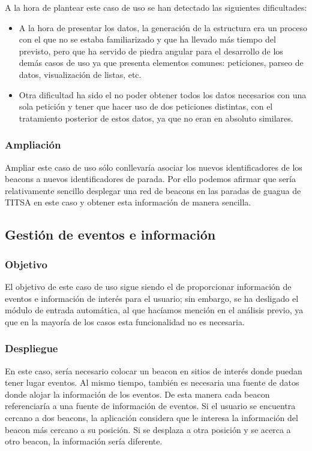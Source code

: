 A la hora de plantear este caso de uso se han detectado las siguientes dificultades: 

\begin{itemize}
\item A la hora de presentar los datos, la generación de la estructura era un proceso con el que no se estaba familiarizado y que ha llevado más tiempo del previsto, pero que ha servido de piedra angular para el desarrollo de los demás casos de uso ya que presenta elementos comunes: peticiones, parseo de datos, visualización de listas, etc.
\item Otra dificultad ha sido el no poder obtener todos los datos necesarios con una sola petición y tener que hacer uso de dos peticiones distintas, con el tratamiento posterior de estos datos, ya que no eran en absoluto similares.
\end{itemize}


\subsubsection{Ampliación}

Ampliar este caso de uso sólo conllevaría asociar los nuevos identificadores de los beacons a nuevos identificadores de parada. Por ello podemos afirmar que sería relativamente sencillo desplegar una red de beacons en las paradas de guagua de TITSA en este caso y obtener esta información de manera sencilla. 


\subsection{Gestión de eventos e información}

\subsubsection{Objetivo}

El objetivo de este caso de uso sigue siendo el de proporcionar información de eventos e información de interés para el usuario; sin embargo, se ha desligado el módulo de entrada automática, al que hacíamos mención en el análisis previo, ya que en la mayoría de los casos esta funcionalidad no es necesaria.  


\subsubsection{Despliegue}


En este caso, sería necesario colocar un beacon en sitios de interés donde puedan tener lugar eventos. Al mismo tiempo, también es necesaria una fuente de datos donde alojar la información de los eventos. De esta manera cada beacon referenciaría a una fuente de información de eventos. Si el usuario se encuentra cercano a dos beacons, la aplicación considera que le interesa la información del beacon más cercano a su posición. Si se desplaza a otra posición y se acerca a otro beacon, la información sería diferente.

